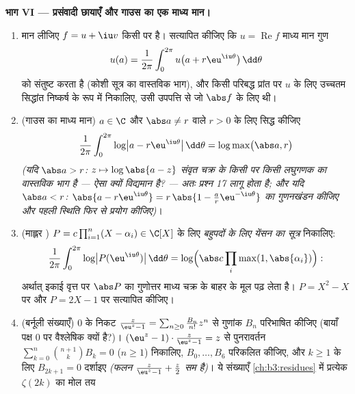 \begin{problem}
\medskip
\noindent\textbf{भाग VI --- प्रसंवादी छायाएँ और गाउस का एक माध्य
मान।}
\begin{enumerate}[resume]
  \item मान लीजिए $f = u + \iu v$ किसी  पर  है।
        सत्यापित कीजिए कि $u = \operatorname{Re}f$ माध्य मान गुण
        \[
        u(a) = \frac1{2\pi}\int_0^{2\pi}
        u\bigl(a + r\eu^{\iu\theta}\bigr)\,\dd\theta
        \]
        को संतुष्ट करता है (कोशी सूत्र का वास्तविक भाग), और किसी
        परिबद्ध प्रांत पर $u$ के लिए उच्चतम सिद्धांत निष्कर्ष के
        रूप में निकालिए, उसी  उपपत्ति से जो $\abs f$ के लिए
        थी।
  \item (गाउस का माध्य मान) $a \in \C$ और $\abs a \neq r$ वाले $r > 0$ के लिए
        सिद्ध कीजिए
        \[
        \frac1{2\pi}\int_0^{2\pi}
        \log\bigl|a - r\eu^{\iu\theta}\bigr|\,\dd\theta
        = \log\max\bigl(\abs a, r\bigr)
        \]
        \emph{(यदि $\abs a > r$: $z \mapsto \log\abs{a - z}$ संवृत चक्र के किसी  पर
        किसी  लघुगणक का वास्तविक भाग है --- ऐसा
        क्यों विद्यमान है? --- अतः प्रश्न 17 लागू होता है; और यदि
        $\abs a < r$: $\abs{a - r\eu^{\iu\theta}} = r\,\abs{1 -
        \frac ar\eu^{-\iu\theta}}$ का गुणनखंडन कीजिए और पहली स्थिति फिर से
        प्रयोग कीजिए)}।
  \item (माह्लर ) $P = c\prod_{i=1}^n(X -
        \alpha_i) \in \C[X]$ के लिए \emph{बहुपदों के लिए येंसन का
        सूत्र} निकालिए:
        \[
        \frac1{2\pi}\int_0^{2\pi}\log\bigl|P(\eu^{\iu\theta})
        \bigr|\,\dd\theta
        = \log\Bigl(\abs c\prod_{i}\max(1,
        \abs{\alpha_i})\Bigr) :
        \]
        अर्थात् इकाई वृत्त पर $\abs P$ का गुणोत्तर माध्य चक्र के बाहर
        के मूल पढ़ लेता है। $P =
        X^2 - X$ पर और $P = 2X - 1$ पर सत्यापित कीजिए।
  \item (बर्नूली संख्याएँ) $0$ के निकट $\frac{z}{\eu^z - 1} = \sum_{n\geq0}\frac{B_n}{n!}
        z^n$ से गुणांक $B_n$
        परिभाषित कीजिए (बायाँ पक्ष $0$ पर वैश्लेषिक क्यों है?)।
        $(\eu^z - 1)\cdot\frac z{\eu^z-1} = z$ से पुनरावर्तन $\sum_{k=0}^{n}\binom{n+1}kB_k = 0$ ($n \geq 1$) निकालिए, $B_0,
        \dots, B_6$ परिकलित
        कीजिए, और $k \geq 1$ के लिए $B_{2k+1} = 0$ दर्शाइए \emph{(फलन $\frac z{\eu^z-1} + \frac z2$ सम
        है)}। ये संख्याएँ \cref{ch:b3:residues} में प्रत्येक $\zeta(2k)$ का मोल तय

\end{enumerate}
\end{problem}
